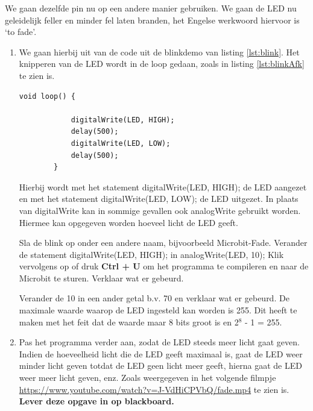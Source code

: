  We gaan dezelfde pin nu op een andere manier gebruiken. We gaan de LED nu geleidelijk feller en minder fel laten branden, het Engelse werkwoord hiervoor is ‘to fade’. 
  \begin{enumerate}
 	\item  We gaan hierbij uit van de code uit de blinkdemo van listing \ref{lst:blink}.  Het knipperen van de LED wordt
 	in de \textcolor{arduinoGreen}{loop} gedaan, zoals in listing \ref{lst:blinkAfk} te zien is.
  	\begin{lstlisting}[caption= Het knipperen van de LED.,label={lst:blinkAfk},firstnumber=15]		
 		void loop() {
 			
 			digitalWrite(LED, HIGH);
 			delay(500);
 			digitalWrite(LED, LOW);
 			delay(500);
 		}
 	\end{lstlisting} 
 	Hierbij wordt met het statement \textcolor{arduinoOrange}{digitalWrite}(LED, \textcolor{arduinoBlue}{HIGH}); de LED aangezet en met het statement \textcolor{arduinoOrange}{digitalWrite}(LED, \textcolor{arduinoBlue}{LOW}); de LED uitgezet.  In plaats van \textcolor{arduinoOrange}{digitalWrite} kan in sommige gevallen ook \textcolor{arduinoOrange}{analogWrite} gebruikt worden. Hiermee kan opgegeven worden hoeveel licht de LED geeft.
 	
 	Sla de blink op onder een andere naam, bijvoorbeeld Microbit-Fade. Verander de statement  \textcolor{arduinoOrange}{digitalWrite}(LED, \textcolor{arduinoBlue}{HIGH}); in \textcolor{arduinoOrange}{analogWrite}(LED, 10);
 	Klik vervolgens op  of druk \colorbox{mygray}{\textbf{Ctrl + U}} om het programma te compileren en naar de Microbit te sturen. Verklaar wat er gebeurd.
 	
 	Verander de 10 in een ander getal b.v. 70 en verklaar wat er gebeurd. De maximale waarde waarop de LED ingesteld kan worden is 255. Dit heeft te maken met het feit dat de waarde maar 8 bits groot is en 2$^{8}$ - 1 = 255.
 
 	\item  Pas het programma verder aan, zodat de LED steeds meer licht gaat geven. Indien de hoeveelheid licht die de LED geeft maximaal is, gaat de LED weer minder licht geven totdat de LED geen licht meer geeft, hierna gaat de LED weer meer licht geven, enz. Zoals weergegeven in het volgende filmpje\\  
 	\href{https://www.youtube.com/watch?v=J-VdHiCPVbQ/fade.mp4}{https://www.youtube.com/watch?v=J-VdHiCPVbQ/fade.mp4} te zien is.\\
 	\textbf{Lever deze opgave in op blackboard.}
   
  \end{enumerate}
 

